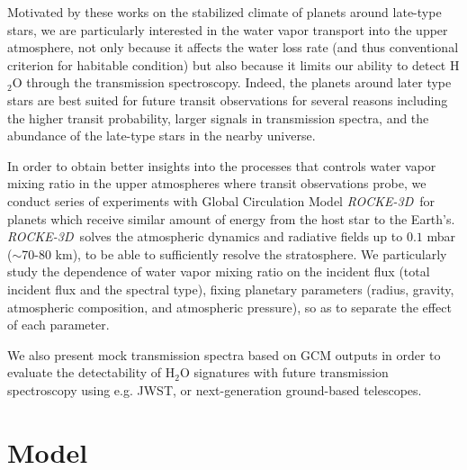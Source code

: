 \documentclass[11pt,numberedappendix,twocolappendix,]{emulateapj}
\def\water{H$_2$O }
\def\modelE{{\it ROCKE-3D}}
\def\memo#1{\color{red}$[${\bf #1}$]$ \color{black}}
\begin{document}
Motivated by these works on the stabilized climate of planets around late-type stars, we are particularly interested in the water vapor transport  into the upper atmosphere, not only because it affects the water loss rate (and thus conventional criterion for habitable condition) but also because it limits our ability to detect \water through the transmission spectroscopy. 
%
Indeed, the planets around later type stars are best suited for future transit observations for several reasons including the higher transit probability, larger signals in transmission spectra, and the abundance of the late-type stars in the nearby universe. 


In order to obtain better insights into the processes that controls water vapor mixing ratio in the upper atmospheres where transit observations probe, we conduct series of experiments with Global Circulation Model \modelE \ for planets which receive similar amount of energy from the host star to the Earth's. 
\modelE \ solves the atmospheric dynamics and radiative fields up to $0.1$ mbar ($\sim $70-80 km), to be able to sufficiently resolve the stratosphere. 
We particularly study the dependence of water vapor mixing ratio on the incident flux (total incident flux and the spectral type), fixing planetary parameters (radius, gravity, atmospheric composition, and atmospheric pressure), so as to separate the effect of each parameter. 

We also present mock transmission spectra based on GCM outputs in order to evaluate the detectability of \water signatures with future transmission spectroscopy using e.g. JWST, or next-generation ground-based telescopes. 




\section{Model}
\label{s:model}
\end{document}
